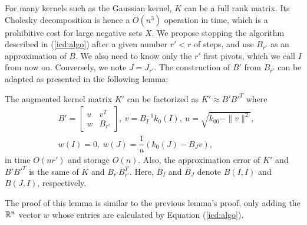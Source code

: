 For many kernels such as the Gaussian kernel, $K$ can be a full rank matrix. Its Cholesky decomposition is hence a $O(n^3)$ operation in time, which is a prohibitive cost for large negative sets $X$. We propose stopping the algorithm described in (\ref{icd:algo}) after a given number $r'<r$ of steps, and use $B_{r'}$ as an approximation of $B$. We also need to know only the $r'$ first pivots, which we call $I$ from now on. Conversely, we note $J=J_{r'}$. The construction of $B'$ from $B_{r'}$ can be adapted as presented in the following lemma:
\begin{lemma}
The augmented kernel matrix $K'$ can be factorized as $K'\approx B'B'^T$ where
\begin{equation}
\begin{split}
& B'=\begin{bmatrix} u & v^T\\w & B_{r'} \end{bmatrix},~ v=B_I^{-1} k_0(I),~ u=\sqrt{k_{00}-\|v\|^2},\\
& w(I) = 0,~w(J)=\dfrac{1}{u}(k_0(J)-B_Jv),
\end{split}
\end{equation}
in time $O(nr')$ and storage $O(n)$. Also, the approximation error of $K'$ and $B'B'^T$ is the same of $K$ and $B_{r'}B_{r'}^T$. Here, $B_I$ and $B_J$ denote $B(I,I)$ and $B(J,I)$, respectively.
\end{lemma}
The proof of this lemma is similar to the previous lemma's proof, only adding the $\mathbb R^n$ vector $w$ whose entries are calculated by Equation (\ref{icd:algo}).
